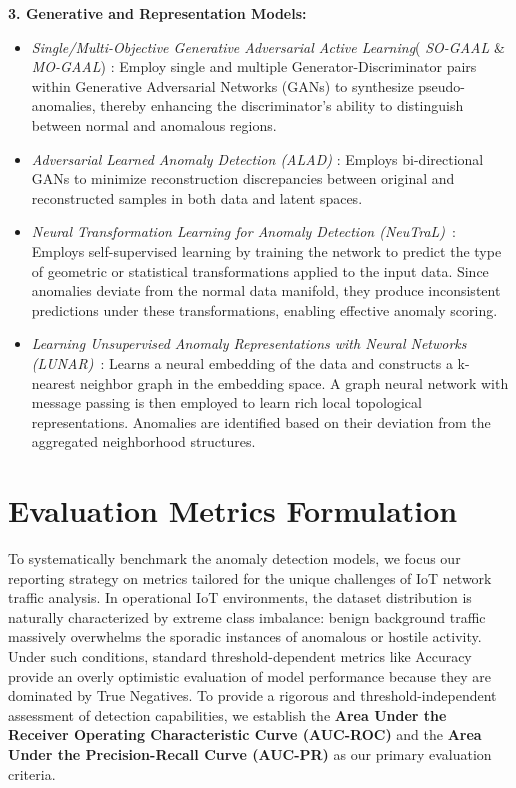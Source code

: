 \documentclass[final,twocolumn,10pt]{elsarticle}
\begin{document}
\textbf{3. Generative and Representation Models:}
\begin{itemize}
    \item \textit{Single/Multi-Objective Generative Adversarial Active Learning}( \textit{SO-GAAL} \& \textit{MO-GAAL}) \cite{SOGAAL}: Employ single and multiple Generator-Discriminator pairs within Generative Adversarial Networks (GANs) to synthesize pseudo-anomalies, thereby enhancing the discriminator’s ability to distinguish between normal and anomalous regions.
    \item \textit{Adversarial Learned Anomaly Detection (ALAD)} \cite{ALAD}: Employs bi-directional GANs to minimize reconstruction discrepancies between original and reconstructed samples in both data and latent spaces.
    \item \textit{Neural Transformation Learning for Anomaly Detection (NeuTraL)}~\cite{qiu2021neural}: Employs self-supervised learning by training the network to predict the type of geometric or statistical transformations applied to the input data. Since anomalies deviate from the normal data manifold, they produce inconsistent predictions under these transformations, enabling effective anomaly scoring.
    \item \textit{Learning Unsupervised Anomaly Representations with Neural Networks (LUNAR)}~\cite{lunar}: Learns a neural embedding of the data and constructs a k-nearest neighbor graph in the embedding space. A graph neural network with message passing is then employed to learn rich local topological representations. Anomalies are identified based on their deviation from the aggregated neighborhood structures.
\end{itemize}

\section{Evaluation Metrics Formulation}
\label{ap1:EM}

To systematically benchmark the anomaly detection models, we focus our reporting strategy on metrics tailored for the unique challenges of IoT network traffic analysis. In operational IoT environments, the dataset distribution is naturally characterized by extreme class imbalance: benign background traffic massively overwhelms the sporadic instances of anomalous or hostile activity. Under such conditions, standard threshold-dependent metrics like Accuracy provide an overly optimistic evaluation of model performance because they are dominated by True Negatives. To provide a rigorous and threshold-independent assessment of detection capabilities, we establish the \textbf{Area Under the Receiver Operating Characteristic Curve (AUC-ROC)} and the \textbf{Area Under the Precision-Recall Curve (AUC-PR)} as our primary evaluation criteria.
\end{document}
